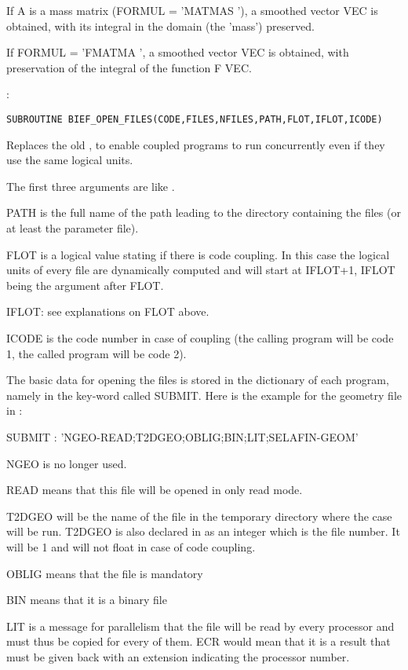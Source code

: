 If A is a mass matrix (FORMUL = 'MATMAS          '), a smoothed vector VEC is
obtained, with its integral in the domain (the 'mass') preserved.

If FORMUL = 'FMATMA          ', a smoothed vector VEC is obtained, with
preservation of the integral of the function F VEC.

:
\begin{lstlisting}[language=TelFortran]
SUBROUTINE BIEF_OPEN_FILES(CODE,FILES,NFILES,PATH,FLOT,IFLOT,ICODE)
\end{lstlisting}

Replaces the old , to enable coupled programs to run concurrently
even if they use the same logical units.

The first three arguments are like .

PATH is the full name of the path leading to the directory containing the files
(or at least the parameter file).

FLOT is a logical value stating if there is code coupling. In this case the
logical units of every file are dynamically computed and will start at IFLOT+1,
IFLOT being the argument after FLOT.

IFLOT: see explanations on FLOT above.

ICODE is the code number in case of coupling (the calling program will be code 1, the called program will be code 2).

The basic data for opening the files is stored in the dictionary of each
program, namely in the key-word called SUBMIT. Here is the example for the
geometry file in :

SUBMIT : 'NGEO-READ;T2DGEO;OBLIG;BIN;LIT;SELAFIN-GEOM'

NGEO is no longer used.

READ means that this file will be opened in only read mode.

T2DGEO will be the name of the file in the temporary directory where the case
will be run. T2DGEO is also declared in  as an integer which is the
file number. It will be 1 and will not float in case of code coupling.

OBLIG means that the file is mandatory

BIN means that it is a binary file

LIT is a message for parallelism that the file will be read by every processor
and must thus be copied for every of them. ECR would mean that it is a result
that must be given back with an extension indicating the processor number.


